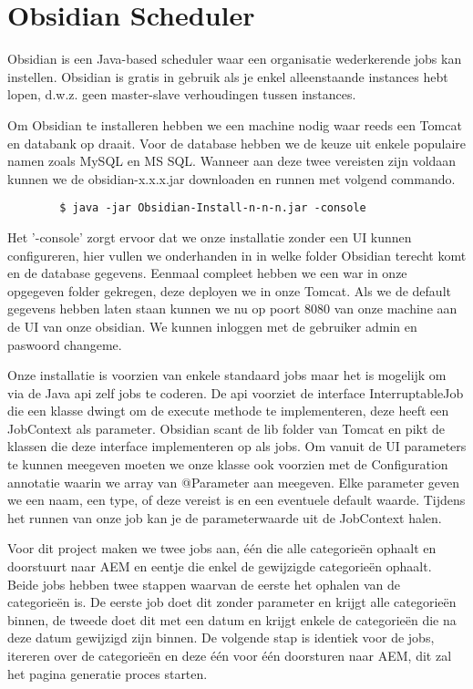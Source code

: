 \documentclass{article}
\begin{document}
	\section{Obsidian Scheduler}
	Obsidian is een Java-based scheduler waar een organisatie wederkerende jobs kan instellen. Obsidian is gratis in gebruik als je enkel alleenstaande instances hebt lopen, d.w.z. geen master-slave verhoudingen tussen instances.
	\par
	Om Obsidian te installeren hebben we een machine nodig waar reeds een Tomcat en databank op draait. Voor de database hebben we de keuze uit enkele populaire namen zoals MySQL en MS SQL. Wanneer aan deze twee vereisten zijn voldaan kunnen we de obsidian-x.x.x.jar downloaden en runnen met volgend commando. 
	\begin{lstlisting}
		$ java -jar Obsidian-Install-n-n-n.jar -console
	\end{lstlisting}
	Het '-console' zorgt ervoor dat we onze installatie zonder een UI kunnen configureren, hier vullen we onderhanden in in welke folder Obsidian terecht komt en de database gegevens. Eenmaal compleet hebben we een war in onze opgegeven folder gekregen, deze deployen we in onze Tomcat. Als we de default gegevens hebben laten staan kunnen we nu op poort 8080 van onze machine aan de UI van onze obsidian. We kunnen inloggen met de gebruiker admin en paswoord changeme.
	\par
	Onze installatie is voorzien van enkele standaard jobs maar het is mogelijk om via de Java api zelf jobs te coderen. De api voorziet de interface InterruptableJob die een klasse dwingt om de execute methode te implementeren, deze heeft een JobContext als parameter. Obsidian scant de lib folder van Tomcat en pikt de klassen die deze interface implementeren op als jobs. Om vanuit de UI parameters te kunnen meegeven moeten we onze klasse ook voorzien met de Configuration annotatie waarin we array van @Parameter aan meegeven. Elke parameter geven we een naam, een type, of deze vereist is en een eventuele default waarde. Tijdens het runnen van onze job kan je de parameterwaarde uit de JobContext halen.
	\par
	Voor dit project maken we twee jobs aan, \'e\'en die alle categorieën ophaalt en doorstuurt naar AEM en eentje die enkel de gewijzigde categorieën ophaalt. Beide jobs hebben twee stappen waarvan de eerste het ophalen van de categorieën is. De eerste job doet dit zonder parameter en krijgt alle categorieën binnen, de tweede doet dit met een datum en krijgt enkele de categorieën die na deze datum gewijzigd zijn binnen. De volgende stap is identiek voor de jobs, itereren over de categorieën en deze \'e\'en voor \'e\'en doorsturen naar AEM, dit zal het pagina generatie proces starten.
\end{document}
